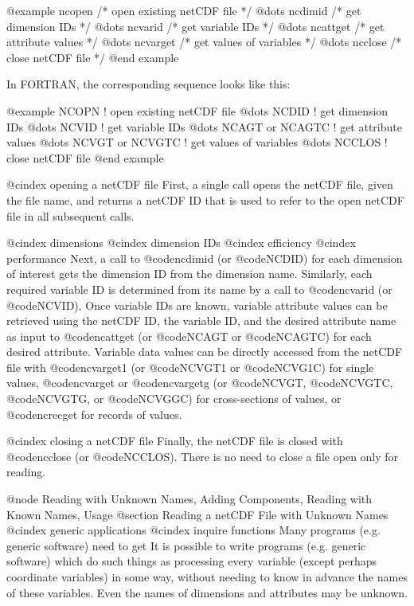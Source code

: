 @example
    ncopen           /* open existing netCDF file */
         @dots{}
       ncdimid       /* get dimension IDs */
         @dots{}
       ncvarid       /* get variable IDs */
         @dots{}
       ncattget      /* get attribute values */
         @dots{}
       ncvarget      /* get values of variables */
         @dots{}
    ncclose          /* close netCDF file */
@end example

In FORTRAN, the corresponding sequence looks like this:

@example
    NCOPN               !  open existing netCDF file
         @dots{}
       NCDID            !  get dimension IDs
         @dots{}
       NCVID            !  get variable IDs
         @dots{}
       NCAGT or NCAGTC  !  get attribute values
         @dots{}
       NCVGT or NCVGTC  !  get values of variables
         @dots{}
    NCCLOS              !  close netCDF file
@end example

@cindex opening a netCDF file
First, a single call opens the netCDF file, given the file name, and
returns a netCDF ID that is used to refer to the open netCDF file in all
subsequent calls.

@cindex dimensions
@cindex dimension IDs
@cindex efficiency
@cindex performance
Next, a call to @code{ncdimid} (or @code{NCDID}) for each dimension of
interest gets the dimension ID from the dimension name.
Similarly, each required variable ID is determined
from its name by a call to @code{ncvarid} (or @code{NCVID}).  Once
variable IDs are known, variable attribute values can be retrieved using
the netCDF ID, the variable ID, and the desired attribute name as input
to @code{ncattget} (or @code{NCAGT} or @code{NCAGTC}) for each desired
attribute.  Variable data values can be directly accessed from the
netCDF file with @code{ncvarget1} (or @code{NCVGT1} or @code{NCVG1C})
for single values, @code{ncvarget} or @code{ncvargetg} (or @code{NCVGT},
@code{NCVGTC}, @code{NCVGTG}, or @code{NCVGGC}) for cross-sections of
values, or @code{ncrecget} for records of values.

@cindex closing a netCDF file
Finally, the netCDF file is closed with @code{ncclose} (or @code{NCCLOS}).
There is no need to close a file open only for reading.

@node Reading with Unknown Names, Adding Components, Reading with Known Names, Usage
@section Reading a netCDF File with Unknown Names
@cindex generic applications
@cindex inquire functions
Many programs (e.g. generic software) need to get
It is possible to write programs (e.g. generic software)
which do such things as processing
every variable (except perhaps coordinate variables) in some way, without
needing to know in advance the names of these variables.
Even the names of dimensions and attributes may be unknown.

